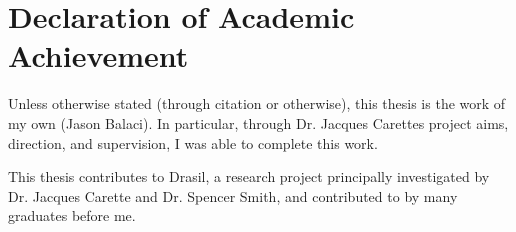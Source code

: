 \chapter{Declaration of Academic Achievement}
\label{chap:declaration_of_academic_achievement} %

Unless otherwise stated (through citation or otherwise), this thesis is the work
of my own (Jason Balaci). In particular, through Dr. Jacques Carettes project
aims, direction, and supervision, I was able to complete this work.

This thesis contributes to Drasil, a research project principally investigated
by Dr. Jacques Carette and Dr. Spencer Smith, and contributed to by many
graduates before me.
